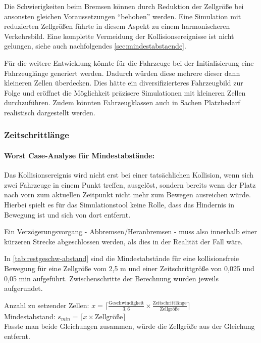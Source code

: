 Die Schwierigkeiten beim Bremsen können durch Reduktion der Zellgröße bei ansonsten gleichen Voraussetzungen \enquote{behoben} werden.
Eine Simulation mit reduzierten Zellgrößen führte in diesem Aspekt zu einem harmonischeren Verkehrsbild.
Eine komplette Vermeidung der Kollisionsereignisse ist nicht gelungen, siehe auch nachfolgendes \cref{sec:mindestabstaende}.

Für die weitere Entwicklung könnte für die Fahrzeuge bei der Initialisierung eine Fahrzeuglänge generiert werden.
Dadurch würden diese mehrere dieser dann kleineren Zellen überdecken.
Dies hätte ein diversifizierteres Fahrzeugbild zur Folge und eröffnet die Möglichkeit präzisere Simulationen mit kleineren Zellen durchzuführen.
Zudem könnten Fahrzeugklassen auch in Sachen Platzbedarf realistisch dargestellt werden.


\subsubsection{Zeitschrittlänge}

\paragraph*{Worst Case-Analyse für Mindestabstände:}
\label{sec:mindestabstaende}

Das Kollisionsereignis wird nicht erst bei einer tatsächlichen Kollision, wenn sich zwei Fahrzeuge in einem Punkt treffen, ausgelöst, sondern bereits wenn der Platz nach vorn zum aktuellen Zeitpunkt nicht mehr zum Bewegen ausreichen würde.
Hierbei spielt es für das Simulationstool keine Rolle, dass das Hindernis in Bewegung ist und sich von dort entfernt.

Ein Verzögerungsvorgang - Abbremsen/Heranbremsen - muss also innerhalb einer kürzeren Strecke abgeschlossen werden, als dies in der Realität der Fall wäre.

In \cref{tab:restgeschw-abstand} sind die Mindestabstände für eine kollisionsfreie Bewegung für eine Zellgröße vom 2,5 m und einer Zeitschrittgröße von 0,025 und 0,05 min aufgeführt.
Zwischenschritte der Berechnung wurden jeweils aufgerundet.

\noindent
Anzahl zu setzender Zellen: $ x = \lceil \frac{\text{Geschwindigkeit}}{3,6} \times \frac{\text{Zeitschrittlänge}}{\text{Zellgröße}} \rceil $
\\
Mindestabstand: $ s_{min} = \lceil x \times \text{Zellgröße} \rceil $
\\
Fasste man beide Gleichungen zusammen, würde die Zellgröße aus der Gleichung entfernt.

